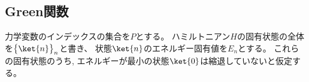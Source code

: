 
\subsection{Green関数}
力学変数のインデックスの集合を$P$とする。
ハミルトニアン$H$の固有状態の全体を$\bigl\{ \ket{n} \bigr\}_{n}$と書き、
状態$\ket{n}$のエネルギー固有値を$E_n$とする。
これらの固有状態のうち, エネルギーが最小の状態$\ket{0}$は縮退していないと仮定する。



